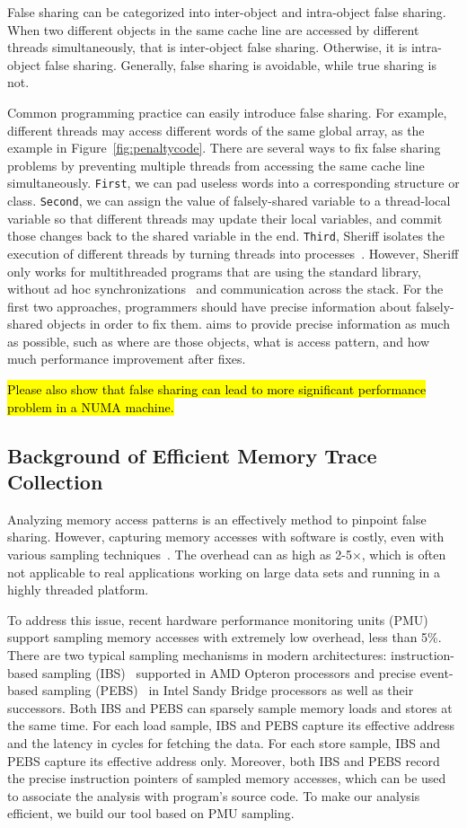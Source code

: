 False sharing can be categorized into inter-object and intra-object false sharing. When two different objects in the same cache line are accessed by different threads simultaneously, that is inter-object false sharing. Otherwise, it is intra-object false sharing. Generally, false sharing is avoidable, while true sharing is not. 

Common programming practice can easily introduce false sharing. For example, different threads may access different words of the same global array, as the example in Figure~\ref{fig:penaltycode}. There are several ways to fix false sharing problems by preventing multiple threads from accessing the same cache line simultaneously. {\tt First},  we can pad useless words into a corresponding structure or class. {\tt Second}, we can assign the value of falsely-shared variable to a thread-local variable so that different threads may update their local variables, and commit those changes back to the shared variable in the end. {\tt Third}, Sheriff isolates the execution of different threads by turning threads into processes~\cite{sheriff}. However, Sheriff only works for multithreaded programs that are using the standard \pthreads{} library, without ad hoc synchronizations~\cite{Xiong:2010:AHS:1924943.1924955} and communication across the stack. For the first two approaches, programmers should have precise information about falsely-shared objects in order to fix them. \cheetah{} aims to provide precise information as much as possible, such as where are those objects, what is access pattern, and how much performance improvement after fixes. 

\hl{Please also show that false sharing can lead to more significant performance problem in a NUMA machine.}

\sloppy
\subsection{Background of Efficient Memory Trace Collection}
Analyzing memory access patterns is an effectively method to pinpoint false sharing. However, capturing memory accesses with software is costly, even with various sampling techniques~\cite{}. The overhead can as high as 2-5$\times$, which is often not applicable to real applications working on large data sets and running in a highly threaded platform. 

To address this issue, recent hardware performance monitoring units (PMU) support sampling memory accesses with extremely low overhead, less than 5\%. There are two typical sampling mechanisms in modern architectures: instruction-based sampling (IBS)~\cite{} supported in AMD Opteron processors and precise event-based sampling (PEBS)~\cite{} in Intel Sandy Bridge processors as well as their successors. Both IBS and PEBS can sparsely sample memory loads and stores at the same time. For each load sample, IBS and PEBS capture its effective address and the latency in cycles for fetching the data. For each store sample, IBS and PEBS capture its effective address only. Moreover, both IBS and PEBS record the precise instruction pointers of sampled memory accesses, which can be used to associate the analysis with program's source code. To make our analysis efficient, we build our tool based on PMU sampling. 


